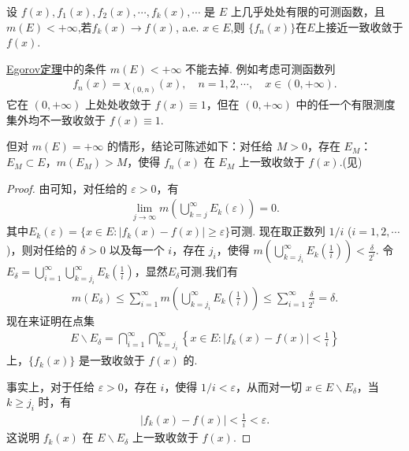 \documentclass[../../main.tex]{subfiles}
\begin{document}
\begin{theorem}\label{theorem:Egorov定理}
设 $f(x),f_1(x),f_2(x),\cdots,f_k(x),\cdots$ 是 $E$ 上几乎处处有限的可测函数，且 $m(E)<+\infty$,若$f_k(x)\to f(x)$, a.e. $x\in E$,则
$\{f_n(x)\}$在$E$上接近一致收敛于$f(x)$.
\end{theorem}
\begin{remark}
\hyperref[theorem:Egorov定理]{Egorov定理}中的条件 $m(E)<+\infty$ 不能去掉. 例如考虑可测函数列
\begin{align*}
f_n(x)=\chi_{(0,n)}(x),\quad n = 1,2,\cdots,\quad x\in(0,+\infty).
\end{align*}
它在 $(0,+\infty)$ 上处处收敛于 $f(x)\equiv1$，但在 $(0,+\infty)$ 中的任一个有限测度集外均不一致收敛于 $f(x)\equiv1$.

但对 $m(E)=+\infty$ 的情形，结论可陈述如下：对任给 $M>0$，存在 $E_M$：$E_M\subset E$，$m(E_M)>M$，使得 $f_n(x)$ 在 $E_M$ 上一致收敛于 $f(x)$.(见)
\end{remark}
\begin{proof}
由可知，对任给的 $\varepsilon>0$，有
\begin{align*}
\lim_{j\to\infty}m\left(\bigcup_{k = j}^{\infty}E_k(\varepsilon)\right)=0.
\end{align*}
其中$E_k(\varepsilon) = \{x \in E: |f_k(x) - f(x)| \geqslant \varepsilon\}$可测.
现在取正数列 $1/i$ ($i = 1,2,\cdots$)，则对任给的 $\delta>0$ 以及每一个 $i$，存在 $j_i$，使得 $m\left(\bigcup_{k = j_i}^{\infty}E_k\left(\frac{1}{i}\right)\right)<\frac{\delta}{2^i}$. 令 $E_\delta=\bigcup_{i = 1}^{\infty}\bigcup_{k = j_i}^{\infty}E_k\left(\frac{1}{i}\right)$，显然$E_\delta$可测.我们有
\begin{align*}
m(E_\delta)\leqslant\sum_{i = 1}^{\infty}m\left(\bigcup_{k = j_i}^{\infty}E_k\left(\frac{1}{i}\right)\right)\leqslant\sum_{i = 1}^{\infty}\frac{\delta}{2^i}=\delta.
\end{align*}
现在来证明在点集
\begin{align*}
E\backslash E_\delta=\bigcap_{i = 1}^{\infty}\bigcap_{k = j_i}^{\infty}\left\{x\in E:\vert f_k(x)-f(x)\vert<\frac{1}{i}\right\}
\end{align*}
上，$\{f_k(x)\}$ 是一致收敛于 $f(x)$ 的.

事实上，对于任给 $\varepsilon>0$，存在 $i$，使得 $1/i<\varepsilon$，从而对一切 $x\in E\backslash E_\delta$，当 $k\geqslant j_i$ 时，有
\begin{align*}
\vert f_k(x)-f(x)\vert<\frac{1}{i}<\varepsilon.
\end{align*}
这说明 $f_k(x)$ 在 $E\backslash E_\delta$ 上一致收敛于 $f(x)$. 
\end{proof}
\end{document}
